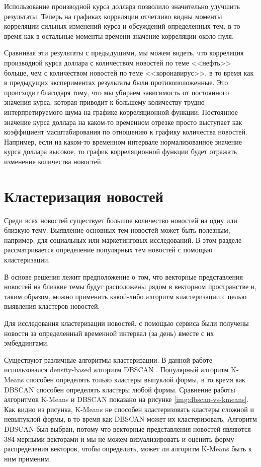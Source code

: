 Использование производной курса доллара позволило значительно улучшить результаты. Теперь на графиках корреляции отчетливо видны моменты корреляции сильных изменений курса и обсуждений определенных тем, в то время как в остальные моменты времени значение корреляции около нуля.

Сравнивая эти результаты с предыдущими, мы можем видеть, что корреляция производной курса доллара с количеством новостей по теме <<нефть>> больше, чем с количеством новостей по теме <<коронавирус>>, в то время как в предыдущих экспериментах результаты были противоположенные. Это происходит благодаря тому, что мы убираем зависимость от постоянного значения курса, которая приводит к большему количеству трудно интерпретируемого шума на графике корреляционной функции. Постоянное значение курса доллара на каком-то временном отрезке просто выступает как коэффициент масштабирования по отношению к графику количества новостей. Например, если на каком-то временном интервале нормализованное значение курса доллара высокое, то график корреляционной функции будет отражать изменение количества новостей.

\section{Кластеризация новостей}

Среди всех новостей существует большое количество новостей на одну или близкую тему. Выявление основных тем новостей может быть полезным, например, для социальных или маркетинговых исследований. В этом разделе рассматривается определение популярных тем новостей с помощью кластеризации.

В основе решения лежит предположение о том, что векторные представления новостей на близкие темы будут расположены рядом в векторном пространстве и, таким образом, можно применить какой-либо алгоритм кластеризации с целью выявления кластеров новостей.

Для исследования кластеризации новостей, с помощью сервиса были получены новости за определенный временной интервал (за день) вместе с их эмбеддингами.

Существуют различные алгоритмы кластеризации. В данной работе использовался density-based алгоритм DBSCAN \cite{clustering-algs}. Популярный алгоритм K-Means способен определять только кластеры выпуклой формы, в то время как DBSCAN способен определять кластеры любой формы. Сравнение работы алгоритмов K-Means и DBSCAN показано на рисунке \ref{img:dbscan-vs-kmeans}. Как видно из рисунка, K-Means не способен кластеризовать кластеры сложной и невыпуклой формы, в то время как DBSCAN может их кластеризовать. Алгоритм DBSCAN был выбран, потому что векторные представления новостей являются 384-мерными векторами и мы не можем визуализировать и оценить форму распределения векторов, чтобы определить, может ли алгоритм K-Means быть к ним применим.

